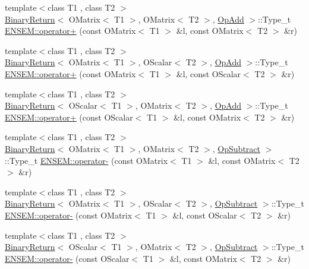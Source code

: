 \begin{DoxyCompactItemize}
\item 
{\footnotesize template$<$class T1 , class T2 $>$ }\\\mbox{\hyperlink{structBinaryReturn}{Binary\+Return}}$<$ O\+Matrix$<$ T1 $>$, O\+Matrix$<$ T2 $>$, \mbox{\hyperlink{structOpAdd}{Op\+Add}} $>$\+::Type\+\_\+t \mbox{\hyperlink{group__obsmatrix_ga0ad42a3395997cd3a2d836e981969fe2}{E\+N\+S\+E\+M\+::operator+}} (const O\+Matrix$<$ T1 $>$ \&l, const O\+Matrix$<$ T2 $>$ \&r)
\item 
{\footnotesize template$<$class T1 , class T2 $>$ }\\\mbox{\hyperlink{structBinaryReturn}{Binary\+Return}}$<$ O\+Matrix$<$ T1 $>$, O\+Scalar$<$ T2 $>$, \mbox{\hyperlink{structOpAdd}{Op\+Add}} $>$\+::Type\+\_\+t \mbox{\hyperlink{group__obsmatrix_ga594575d5bb0ce31fd07e9fb29fd9c8ac}{E\+N\+S\+E\+M\+::operator+}} (const O\+Matrix$<$ T1 $>$ \&l, const O\+Scalar$<$ T2 $>$ \&r)
\item 
{\footnotesize template$<$class T1 , class T2 $>$ }\\\mbox{\hyperlink{structBinaryReturn}{Binary\+Return}}$<$ O\+Scalar$<$ T1 $>$, O\+Matrix$<$ T2 $>$, \mbox{\hyperlink{structOpAdd}{Op\+Add}} $>$\+::Type\+\_\+t \mbox{\hyperlink{group__obsmatrix_ga6cdb2a903fbc9f5a836a442a81275a56}{E\+N\+S\+E\+M\+::operator+}} (const O\+Scalar$<$ T1 $>$ \&l, const O\+Matrix$<$ T2 $>$ \&r)
\item 
{\footnotesize template$<$class T1 , class T2 $>$ }\\\mbox{\hyperlink{structBinaryReturn}{Binary\+Return}}$<$ O\+Matrix$<$ T1 $>$, O\+Matrix$<$ T2 $>$, \mbox{\hyperlink{structOpSubtract}{Op\+Subtract}} $>$\+::Type\+\_\+t \mbox{\hyperlink{group__obsmatrix_ga71b6bee34df2dbf2b2312b75612fd45f}{E\+N\+S\+E\+M\+::operator-\/}} (const O\+Matrix$<$ T1 $>$ \&l, const O\+Matrix$<$ T2 $>$ \&r)
\item 
{\footnotesize template$<$class T1 , class T2 $>$ }\\\mbox{\hyperlink{structBinaryReturn}{Binary\+Return}}$<$ O\+Matrix$<$ T1 $>$, O\+Scalar$<$ T2 $>$, \mbox{\hyperlink{structOpSubtract}{Op\+Subtract}} $>$\+::Type\+\_\+t \mbox{\hyperlink{group__obsmatrix_ga14c923aa4a21485e30dc3ed6f5c0ab46}{E\+N\+S\+E\+M\+::operator-\/}} (const O\+Matrix$<$ T1 $>$ \&l, const O\+Scalar$<$ T2 $>$ \&r)
\item 
{\footnotesize template$<$class T1 , class T2 $>$ }\\\mbox{\hyperlink{structBinaryReturn}{Binary\+Return}}$<$ O\+Scalar$<$ T1 $>$, O\+Matrix$<$ T2 $>$, \mbox{\hyperlink{structOpSubtract}{Op\+Subtract}} $>$\+::Type\+\_\+t \mbox{\hyperlink{group__obsmatrix_ga57164fdcdeca01384e08724c0cf01504}{E\+N\+S\+E\+M\+::operator-\/}} (const O\+Scalar$<$ T1 $>$ \&l, const O\+Matrix$<$ T2 $>$ \&r)

\end{DoxyCompactItemize}
